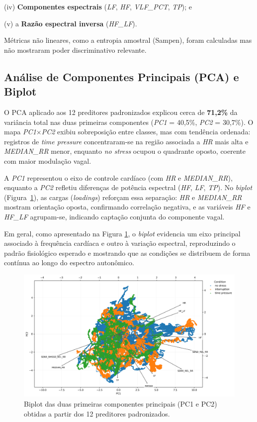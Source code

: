 \documentclass[conference]{IEEEtran}
\begin{document}
(iv) \textbf{Componentes espectrais} (\textit{LF}, \textit{HF}, \textit{VLF\_PCT}, \textit{TP}); e 

(v) a \textbf{Razão espectral inversa} (\textit{HF\_LF}).

Métricas não lineares, como a entropia amostral (Sampen), foram calculadas mas não mostraram poder discriminativo relevante.

\subsection{Análise de Componentes Principais (PCA) e Biplot}
O PCA aplicado aos 12 preditores padronizados explicou cerca de \textbf{71,2\%} da variância total nas duas primeiras componentes (\textit{PC1} = 40,5\%, \textit{PC2} = 30,7\%). 
O mapa \textit{PC1}$\times$\textit{PC2} exibiu sobreposição entre classes, mas com tendência ordenada: registros de \textit{time pressure} concentraram-se na região associada a \textit{HR} mais alta e \textit{MEDIAN\_RR} menor, enquanto \textit{no stress} ocupou o quadrante oposto, coerente com maior modulação vagal. 

A \textit{PC1} representou o eixo de controle cardíaco (com \textit{HR} e \textit{MEDIAN\_RR}), enquanto a \textit{PC2} refletiu diferenças de potência espectral (\textit{HF}, \textit{LF}, \textit{TP}). 
No \textit{biplot} (Figura~\ref{fig:biplot_pca}), as cargas (\textit{loadings}) reforçam essa separação: \textit{HR} e \textit{MEDIAN\_RR} mostram orientação oposta, confirmando correlação negativa, e as variáveis \textit{HF} e \textit{HF\_LF} agrupam-se, indicando captação conjunta do componente vagal.  

Em geral, como apresentado na Figura \ref{fig:biplot_pca}, o \textit{biplot} evidencia um eixo principal associado à frequência cardíaca e outro à variação espectral, reproduzindo o padrão fisiológico esperado e mostrando que as condições se distribuem de forma contínua ao longo do espectro autonômico.

\begin{figure}[H]
    \centering
    \includegraphics[width=\linewidth]{../../../images/Anderson/biplot_pca_2variaveis.png}
    \caption{Biplot das duas primeiras componentes principais (PC1 e PC2) obtidas a partir dos 12 preditores padronizados.}
    \label{fig:biplot_pca}
\end{figure}
\end{document}
